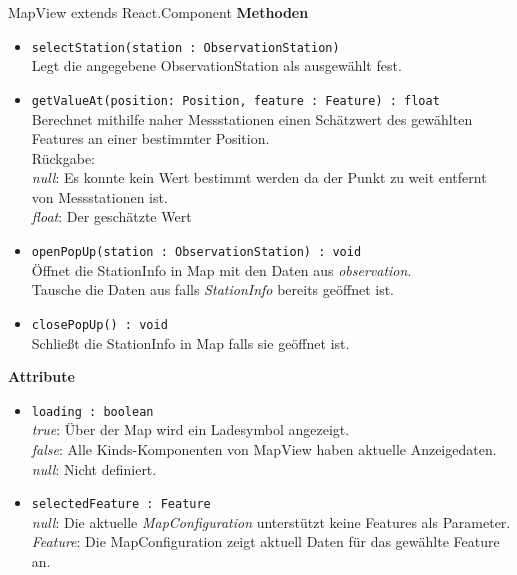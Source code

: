 \begin{Class}{MapView extends React.Component}
    \textbf{Methoden}
    \begin{itemize}
        \item \texttt{selectStation(station : ObservationStation)}
        \\ Legt die angegebene ObservationStation als ausgewählt fest.
        \item \texttt{getValueAt(position: Position, feature : Feature) : float}
        \\ Berechnet mithilfe naher Messstationen einen Schätzwert des gewählten Features an einer bestimmter Position.
        \\ Rückgabe:
        \\ \emph{null}: Es konnte kein Wert bestimmt werden da der Punkt zu weit entfernt von Messstationen ist.
        \\ \emph{float}: Der geschätzte Wert
        \item \texttt{openPopUp(station : ObservationStation) : void}
        \\ Öffnet die StationInfo in Map mit den Daten aus \emph{observation}.
        \\ Tausche die Daten aus falls \emph{StationInfo} bereits geöffnet ist.
        \item \texttt{closePopUp() : void}
        \\ Schließt die StationInfo in Map falls sie geöffnet ist.
    \end{itemize}
    \textbf{Attribute}
    \begin{itemize}
        \item \texttt{loading : boolean}
        \\ \emph{true}: Über der Map wird ein Ladesymbol angezeigt.
        \\ \emph{false}: Alle Kinds-Komponenten von MapView haben aktuelle Anzeigedaten.
        \\ \emph{null}: Nicht definiert.
        \item \texttt{selectedFeature : Feature}
        \\ \emph{null}: Die aktuelle \emph{MapConfiguration} unterstützt keine Features als Parameter.
        \\ \emph{Feature}: Die MapConfiguration zeigt aktuell Daten für das gewählte Feature an.
    \end{itemize}
\end{Class}


